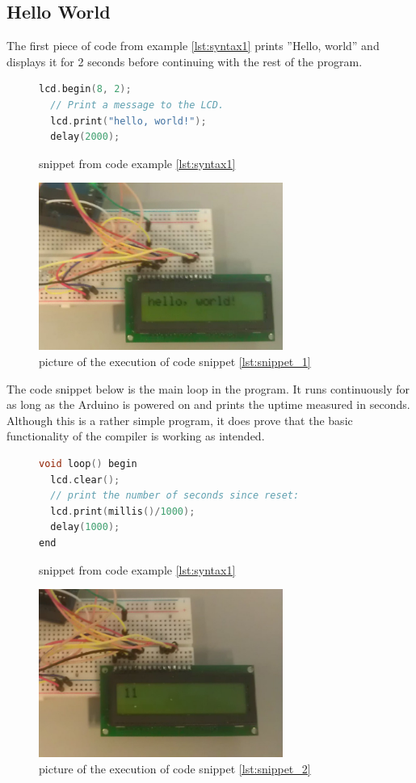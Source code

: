 \subsection*{Hello World}
The first piece of code from example \ref{lst:syntax1} prints ''Hello, world'' and displays it for 2 seconds before continuing with the rest of the program.
\begin{figure}[h]
\begin{lstlisting}[caption=Hello World ,firstnumber=11, language={C++}, label=lst:snippet_1]
  lcd.begin(8, 2);
  // Print a message to the LCD.
  lcd.print("hello, world!");
  delay(2000);
\end{lstlisting}
\caption{snippet from code example \ref{lst:syntax1}}
\end{figure}
\begin{figure}[h]
\centering
\includegraphics[width=8cm]{billeder/test_hello_1.jpg}
\caption{picture of the execution of code snippet \ref{lst:snippet_1}}
\end{figure}

The code snippet below is the main loop in the program. It runs continuously for as long as the Arduino is powered on and prints the uptime measured in seconds. Although this is a rather simple program, it does prove that the basic functionality of the compiler is working as intended.
\begin{figure}[h]
\begin{lstlisting}[caption=Hello World ,firstnumber=17, language={C++},label=lst:snippet_2]
void loop() begin
  lcd.clear();
  // print the number of seconds since reset:
  lcd.print(millis()/1000);
  delay(1000);
end
\end{lstlisting}
\caption{snippet from code example \ref{lst:syntax1}}
\end{figure}
\begin{figure}[htb]
\centering
\includegraphics[width=8cm]{billeder/test_hello_2.jpg}
\caption{picture of the execution of code snippet \ref{lst:snippet_2}}
\end{figure}

